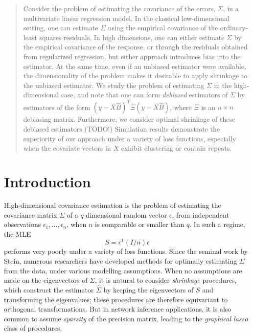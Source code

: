 \documentclass[12pt]{article}
\begin{document}
\maketitle

\newcommand{\tr}{\text{tr}}
\newcommand{\E}{\textbf{E}}
\newcommand{\diag}{\text{diag}}
\newcommand{\argmax}{\text{argmax}}
\newcommand{\Cov}{\text{Cov}}
\newcommand{\Var}{\text{Var}}
\newcommand{\argmin}{\text{argmin}}
\newcommand{\Vol}{\text{Vol}}
\newcommand{\comm}[1]{}

\begin{abstract}
Consider the problem of estimating the covariance of the errors,
$\Sigma$, in a multivariate linear regression model.  In the classical
low-dimensional setting, one can estimate $\Sigma$ using the empirical
covariance of the ordinary-least squares residuals.  In high
dimensions, one can either estimate $\Sigma$ by the empirical
covariance of the response, or through the residuals obtained from
regularized regression, but either approach introduces bias into the
estimator.  At the same time, even if an unbiased estimator were
available, the dimensionality of the problem makes it desirable to
apply shrinkage to the unbiased estimator.  We study the problem of
estimating $\Sigma$ in the high-dimensional case, and note that one
can form \emph{debiased} estimators of $\Sigma$ by estimators of the
form $(y-X\hat{B})^T \Xi (y-X\hat{B})$, where $\Xi$ is an $n \times n$
debiasing matrix.  Furthermore, we consider optimal shrinkage of these
debiased estimators (TODO!) Simulation results demonstrate the
superiority of our approach under a variety of loss functions,
especially when the covariate vectors in $X$ exhibit clustering or
contain repeats.
\end{abstract}

\section{Introduction}

High-dimensional covariance estimation is the problem of estimating
the covariance matrix $\Sigma$ of a $q$-dimensional random vector
$\epsilon$, from independent observations
$\epsilon_1,\hdots,\epsilon_n$, when $n$ is comparable or smaller than
$q$.  In such a regime, the MLE
\[
S = \epsilon^T (I/n) \epsilon
\]
performs very poorly under a variety of loss functions.  Since the
seminal work by Stein, numerous researchers have developed methods for
optimally estimating $\Sigma$ from the data, under various modelling
assumptions.  When no assumptions are made on the eigenvectors of
$\Sigma$, it is natural to consider \emph{shrinkage} procedures, which
construct the estimator $\hat{\Sigma}$ by keeping the eigenvectors of
$S$ and transforming the eigenvalues; these procedures are therefore
equivariant to orthogonal transformations.  But in network inference
applications, it is also common to assume \emph{sparsity} of the
precision matrix, leading to the \emph{graphical lasso} class of
procedures.
\end{document}
